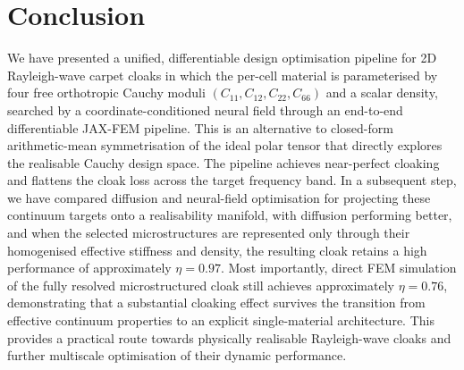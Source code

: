 \documentclass[preprint,12pt]{elsarticle}
\begin{document}
\section{Conclusion}\label{sec:conclusion}

We have presented a unified, differentiable design optimisation pipeline for
2D Rayleigh-wave carpet cloaks in which the per-cell
material is parameterised by four free orthotropic Cauchy moduli
$(C_{11},C_{12},C_{22},C_{66})$ and a scalar density, searched by a
coordinate-conditioned neural field through an end-to-end differentiable
JAX-FEM pipeline. This is an alternative to closed-form arithmetic-mean
symmetrisation of the ideal polar tensor that directly explores the
realisable Cauchy design space. The pipeline achieves near-perfect cloaking and flattens the cloak loss across the target frequency band. In a subsequent step, we have compared diffusion and neural-field optimisation for projecting these continuum targets onto a realisability manifold, with diffusion performing better, and when the selected microstructures are represented only through their homogenised effective stiffness and density, the resulting cloak retains a high performance of approximately $\eta=0.97$. Most importantly, direct FEM simulation of the fully resolved microstructured cloak still achieves approximately $\eta=0.76$, demonstrating that a substantial cloaking effect survives the transition from effective continuum properties to an explicit single-material architecture. This provides a practical route towards physically realisable Rayleigh-wave cloaks and further multiscale optimisation of their dynamic performance.










\end{document}
